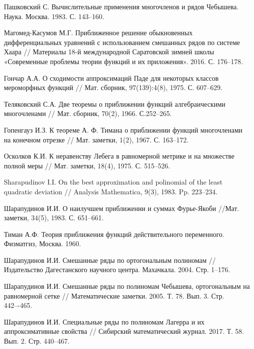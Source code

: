 \begin{thebibliography}{20}
{Пашковский С.} Вычислительные применения многочленов и рядов Чебышева. Наука. Москва. 1983. С. 143--160.


{Магомед-Касумов М.Г.}
Приближенное решение обыкновенных дифференциальных уравнений с использованием смешанных рядов по системе Хаара
// Материалы 18-й международной Саратовской зимней школы «Современные проблемы теории функций и их приложения». 2016. С. 176--178.


{Гончар А.А.}
О сходимости аппроксимаций Паде для некоторых классов мероморфных функций
// Мат. сборник, 97(139):4(8), 1975. С. 607--629.


{Теляковский С.А.}
Две теоремы о приближении функций алгебраическими многочленами
// Мат. сборник, 70(2), 1966. С.252--265.


{Гопенгауз И.З.}
К теореме А. Ф. Тимана о приближении функций многочленами на конечном отрезке
// Мат. заметки, 1(2), 1967. С. 163--172.


{Осколков К.И.}
К неравенству Лебега в равномерной метрике и на множестве полной меры
// Мат.  заметки, 18(4), 1975. С. 515--526.


{Sharapudinov I.I.}
On the best approximation and polinomial of the least quadratic deviation
// Analysis Mathematica, 9(3), 1983. Pp. 223--234.


{Шарапудинов И.И.}
О наилучшем приближении и суммах Фурье-Якоби
//Мат. заметки, 34(5), 1983. С. 651--661.


{Тиман А.Ф.} Теория приближения функций действительного переменного. Физматгиз, Москва. 1960.


{Шарапудинов И.И.}
Смешанные ряды по ортогональным полиномам // Издательство Дагестанского научного центра. Махачкала. 2004. Стр. 1--176.


{Шарапудинов И.И.}
Смешанные ряды по полиномам Чебышева, ортогональным на равномерной сетке // Математические заметки. 2005. Т. 78. Вып. 3. Стр. 442–-465.


{Шарапудинов И.И.}
Специальные ряды по полиномам Лагерра и их аппроксимативные свойства // Сибирский математический журнал. 2017. Т. 58. Вып. 2. Стр. 440--467.



\end{thebibliography}
